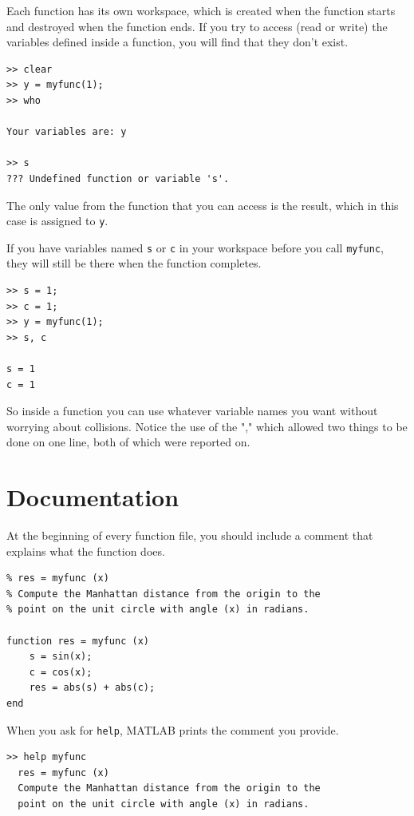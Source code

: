 \documentclass{book}
\begin{document}
Each function has its own workspace, which is created when the
function starts and destroyed when the function ends.  If you try to
access (read or write) the variables defined inside a function, you
will find that they don't exist.

\begin{verbatim}
>> clear
>> y = myfunc(1);
>> who

Your variables are: y
  
>> s
??? Undefined function or variable 's'.
\end{verbatim}

The only value from the function that you can access is the result,
which in this case is assigned to {\tt y}.

If you have variables named {\tt s} or {\tt c} in your workspace
before you call {\tt myfunc}, they will still be there when the
function completes.

\begin{verbatim}
>> s = 1;
>> c = 1;
>> y = myfunc(1);
>> s, c

s = 1
c = 1
\end{verbatim}

So inside a function you can use whatever variable names you
want without worrying about collisions.  
Notice the use of the "," which allowed two things to be done on
one line, both of which were reported on.  


\section{Documentation}

At the beginning of every function file, you should include a comment
that explains what the function does.

\begin{verbatim}
% res = myfunc (x)
% Compute the Manhattan distance from the origin to the
% point on the unit circle with angle (x) in radians.

function res = myfunc (x)
    s = sin(x);
    c = cos(x);
    res = abs(s) + abs(c);
end
\end{verbatim}

When you ask for {\tt help}, MATLAB prints the comment you
provide.

\begin{verbatim}
>> help myfunc
  res = myfunc (x)
  Compute the Manhattan distance from the origin to the
  point on the unit circle with angle (x) in radians.
\end{verbatim}
\end{document}
